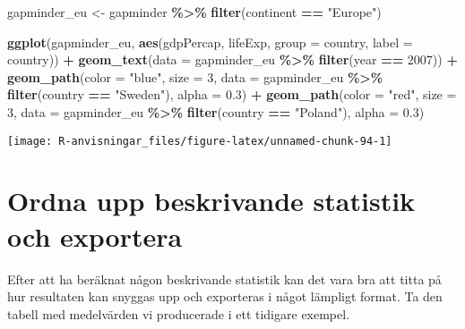 \documentclass[
]{book}
\newenvironment{Shaded}{\begin{snugshade}}{\end{snugshade}}
\newcommand{\AttributeTok}[1]{\textcolor[rgb]{0.13,0.29,0.53}{#1}}
\newcommand{\DecValTok}[1]{\textcolor[rgb]{0.00,0.00,0.81}{#1}}
\newcommand{\FloatTok}[1]{\textcolor[rgb]{0.00,0.00,0.81}{#1}}
\newcommand{\FunctionTok}[1]{\textcolor[rgb]{0.13,0.29,0.53}{\textbf{#1}}}
\newcommand{\NormalTok}[1]{#1}
\newcommand{\OtherTok}[1]{\textcolor[rgb]{0.56,0.35,0.01}{#1}}
\newcommand{\SpecialCharTok}[1]{\textcolor[rgb]{0.81,0.36,0.00}{\textbf{#1}}}
\newcommand{\StringTok}[1]{\textcolor[rgb]{0.31,0.60,0.02}{#1}}
\theoremstyle{definition}
\theoremstyle{definition}
\theoremstyle{definition}
\theoremstyle{definition}
\theoremstyle{remark}
\begin{document}
\begin{Shaded}
\begin{Highlighting}[]
\NormalTok{gapminder\_eu }\OtherTok{\textless{}{-}}\NormalTok{ gapminder }\SpecialCharTok{\%\textgreater{}\%} \FunctionTok{filter}\NormalTok{(continent }\SpecialCharTok{==} \StringTok{"Europe"}\NormalTok{)}

\FunctionTok{ggplot}\NormalTok{(gapminder\_eu, }\FunctionTok{aes}\NormalTok{(gdpPercap, lifeExp, }\AttributeTok{group =}\NormalTok{ country, }\AttributeTok{label =}\NormalTok{ country)) }\SpecialCharTok{+}
  \FunctionTok{geom\_text}\NormalTok{(}\AttributeTok{data =}\NormalTok{ gapminder\_eu }\SpecialCharTok{\%\textgreater{}\%} \FunctionTok{filter}\NormalTok{(year }\SpecialCharTok{==} \DecValTok{2007}\NormalTok{)) }\SpecialCharTok{+}
  \FunctionTok{geom\_path}\NormalTok{(}\AttributeTok{color =} \StringTok{"blue"}\NormalTok{, }\AttributeTok{size =} \DecValTok{3}\NormalTok{, }\AttributeTok{data =}\NormalTok{ gapminder\_eu }\SpecialCharTok{\%\textgreater{}\%} \FunctionTok{filter}\NormalTok{(country }\SpecialCharTok{==} \StringTok{"Sweden"}\NormalTok{), }\AttributeTok{alpha =} \FloatTok{0.3}\NormalTok{) }\SpecialCharTok{+}
  \FunctionTok{geom\_path}\NormalTok{(}\AttributeTok{color =} \StringTok{"red"}\NormalTok{, }\AttributeTok{size =} \DecValTok{3}\NormalTok{, }\AttributeTok{data =}\NormalTok{ gapminder\_eu }\SpecialCharTok{\%\textgreater{}\%} \FunctionTok{filter}\NormalTok{(country }\SpecialCharTok{==} \StringTok{"Poland"}\NormalTok{), }\AttributeTok{alpha =} \FloatTok{0.3}\NormalTok{)}
\end{Highlighting}
\end{Shaded}

\begin{center}\texttt{[image: R-anvisningar\_files/figure-latex/unnamed-chunk-94-1]} \end{center}

\hypertarget{ordna-upp-beskrivande-statistik-och-exportera}{%
\section{Ordna upp beskrivande statistik och exportera}\label{ordna-upp-beskrivande-statistik-och-exportera}}

Efter att ha beräknat någon beskrivande statistik kan det vara bra att titta på hur resultaten kan snyggas upp och exporteras i något lämpligt format. Ta den tabell med medelvärden vi producerade i ett tidigare exempel.
\end{document}
